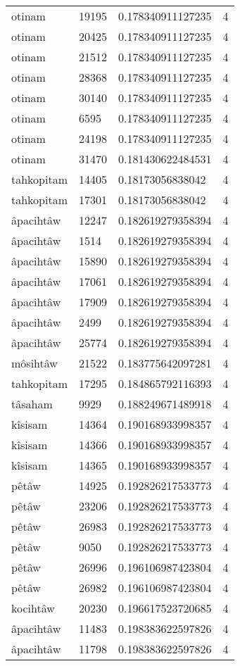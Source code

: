 \begin{longtable}{llll}
otinam & 19195 & 0.178340911127235 & 4 \\
otinam & 20425 & 0.178340911127235 & 4 \\
otinam & 21512 & 0.178340911127235 & 4 \\
otinam & 28368 & 0.178340911127235 & 4 \\
otinam & 30140 & 0.178340911127235 & 4 \\
otinam & 6595 & 0.178340911127235 & 4 \\
otinam & 24198 & 0.178340911127235 & 4 \\
otinam & 31470 & 0.181430622484531 & 4 \\
tahkopitam & 14405 & 0.18173056838042 & 4 \\
tahkopitam & 17301 & 0.18173056838042 & 4 \\
âpacihtâw & 12247 & 0.182619279358394 & 4 \\
âpacihtâw & 1514 & 0.182619279358394 & 4 \\
âpacihtâw & 15890 & 0.182619279358394 & 4 \\
âpacihtâw & 17061 & 0.182619279358394 & 4 \\
âpacihtâw & 17909 & 0.182619279358394 & 4 \\
âpacihtâw & 2499 & 0.182619279358394 & 4 \\
âpacihtâw & 25774 & 0.182619279358394 & 4 \\
môsihtâw & 21522 & 0.183775642097281 & 4 \\
tahkopitam & 17295 & 0.184865792116393 & 4 \\
tâsaham & 9929 & 0.188249671489918 & 4 \\
kîsisam & 14364 & 0.190168933998357 & 4 \\
kîsisam & 14366 & 0.190168933998357 & 4 \\
kîsisam & 14365 & 0.190168933998357 & 4 \\
pêtâw & 14925 & 0.192826217533773 & 4 \\
pêtâw & 23206 & 0.192826217533773 & 4 \\
pêtâw & 26983 & 0.192826217533773 & 4 \\
pêtâw & 9050 & 0.192826217533773 & 4 \\
pêtâw & 26996 & 0.196106987423804 & 4 \\
pêtâw & 26982 & 0.196106987423804 & 4 \\
kocihtâw & 20230 & 0.196617523720685 & 4 \\
âpacihtâw & 11483 & 0.198383622597826 & 4 \\
âpacihtâw & 11798 & 0.198383622597826 & 4 \\

\end{longtable}
